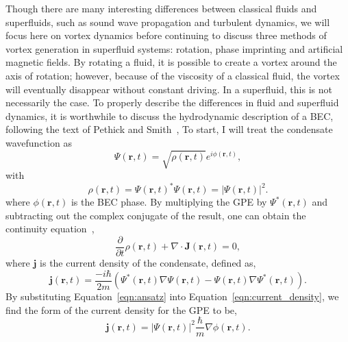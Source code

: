 Though there are many interesting differences between classical fluids and superfluids, such as sound wave propagation and turbulent dynamics, we will focus here on vortex dynamics before continuing to discuss three methods of vortex generation in superfluid systems: rotation, phase imprinting and artificial magnetic fields.
By rotating a fluid, it is possible to create a vortex around the axis of rotation; however, because of the viscosity of a classical fluid, the vortex will eventually disappear without constant driving.
In a superfluid, this is not necessarily the case.
To properly describe the differences in fluid and superfluid dynamics, it is worthwhile to discuss the hydrodynamic description of a BEC, following the text of Pethick and Smith~\cite{pethick2002},
To start, I will treat the condensate wavefunction as
\begin{equation}
\Psi(\mathbf{r},t) = \sqrt{\rho(\mathbf{r},t)}e^{i\phi(\mathbf{r},t)},
\label{eqn:ansatz}
\end{equation}
\noindent with
\begin{equation}
\rho(\mathbf{r},t)=\Psi(\mathbf{r},t)^*\Psi(\mathbf{r},t) = |\Psi(\mathbf{r},t)|^2.
\end{equation}
\noindent where $\phi(\mathbf{r},t)$ is the BEC phase.
By multiplying the GPE by $\Psi^*(\mathbf{r},t)$ and subtracting out the complex conjugate of the result, one can obtain the continuity equation~\cite{pethick2002},
\begin{equation}
\frac{\partial}{\partial t}\rho(\mathbf{r},t)+\nabla\cdot\mathbf{J}(\mathbf{r},t) = 0,
\end{equation}
\noindent where $\mathbf{j}$ is the current density of the condensate, defined as,
\begin{equation}
\mathbf{j}(\mathbf{r},t) = \frac{-i\hbar}{2m}\left( \Psi^*(\mathbf{r},t)\nabla\Psi(\mathbf{r},t)- \Psi(\mathbf{r},t)\nabla\Psi^*(\mathbf{r},t)\right).
\label{eqn:current_density}
\end{equation}
By substituting Equation~\eqref{eqn:ansatz} into Equation~\eqref{eqn:current_density}, we find the form of the current density for the GPE to be,
\begin{equation}
\mathbf{j}(\mathbf{r},t) = |\Psi(\mathbf{r},t)|^2\frac{\hbar}{m}\nabla\phi(\mathbf{r},t).
\end{equation}

